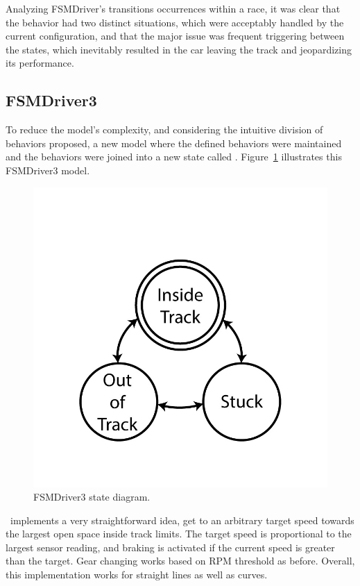 Analyzing FSMDriver's transitions occurrences within a race, it was clear that the  behavior had two distinct situations, which were acceptably handled by the current configuration, and that the major issue was frequent triggering between the  states, which inevitably resulted in the car leaving the track and jeopardizing its performance.

\subsection{FSMDriver3}%
To reduce the model's complexity, and considering the intuitive division of behaviors proposed, a new model where the defined  behaviors were maintained and the  behaviors were joined into a new state called \IT. Figure~\ref{Fig:FSM3Diagram} illustrates this FSMDriver3 model.

\begin{figure}[h]
	\centering
	\includegraphics[width=.45\textwidth]{ThreeStateFSM}
	\caption{FSMDriver3 state diagram.}
	\label{Fig:FSM3Diagram}
\end{figure}

\IT~implements a very straightforward idea, get to an arbitrary target speed towards the largest open space inside track limits. The target speed is proportional to the largest sensor reading, and braking is activated if the current speed is greater than the target. Gear changing works based on RPM threshold as before. Overall, this implementation works for straight lines as well as curves.

